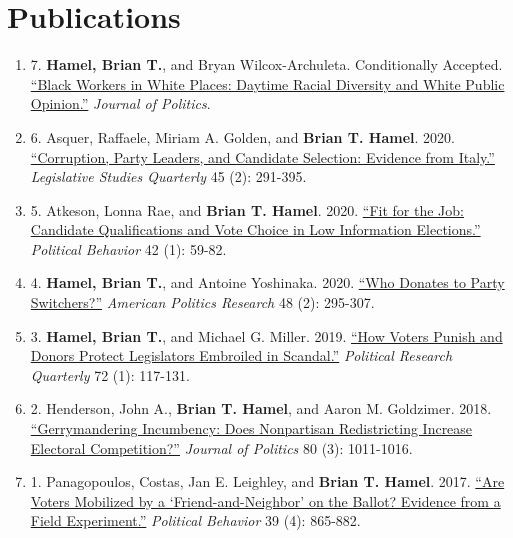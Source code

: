 \documentclass[12pt]{article}
\begin{document}
\section*{Publications}

\begin{enumerate}[topsep = 0pt, itemsep = 1ex, partopsep  = 1ex, parsep = 1ex]

	\item[] 7. \textbf{Hamel, Brian T.}, and Bryan Wilcox-Archuleta. Conditionally Accepted. \href{https://www.brianhamel.me/files/context.pdf}{``Black Workers in White Places: Daytime Racial Diversity and White Public Opinion.''} \textit{Journal of Politics}.

	\item[] 6. Asquer, Raffaele, Miriam A. Golden, and \textbf{Brian T. Hamel}. 2020. \href{https://www.brianhamel.me/files/italy.pdf}{``Corruption, Party Leaders, and Candidate Selection: Evidence from Italy.''} \textit{Legislative Studies Quarterly} 45 (2): 291-395.
	
	\item[] 5. Atkeson, Lonna Rae, and \textbf{Brian T. Hamel}. 2020. \href{https://www.brianhamel.me/files/teachers.pdf}{``Fit for the Job: Candidate Qualifications and Vote Choice in Low Information Elections.''} \textit{Political Behavior} 42 (1): 59-82.
	
	\item[] 4. \textbf{Hamel, Brian T.}, and Antoine Yoshinaka. 2020. \href{https://www.brianhamel.me/files/switchers.pdf}{``Who Donates to Party Switchers?''} \textit{American Politics Research} 48 (2): 295-307.

	\item[] 3. \textbf{Hamel, Brian T.}, and Michael G. Miller. 2019. \href{https://www.brianhamel.me/files/scandal.pdf}{``How Voters Punish and Donors Protect Legislators Embroiled in Scandal.''} \textit{Political Research Quarterly} 72 (1): 117-131.

	\item[] 2. Henderson, John A., \textbf{Brian T. Hamel}, and Aaron M. Goldzimer. 2018. \href{https://www.brianhamel.me/files/gerrymandering.pdf}{``Gerrymandering Incumbency: Does Nonpartisan Redistricting Increase Electoral Competition?''} \textit{Journal of Politics} 80 (3): 1011-1016.

	\item[] 1. Panagopoulos, Costas, Jan E. Leighley, and \textbf{Brian T. Hamel}. 2017. \href{https://www.brianhamel.me/files/friends.pdf}{``Are Voters Mobilized by a `Friend-and-Neighbor' on the Ballot? Evidence from a Field Experiment.''} \textit{Political Behavior} 39 (4): 865-882.

\end{enumerate}
\end{document}
